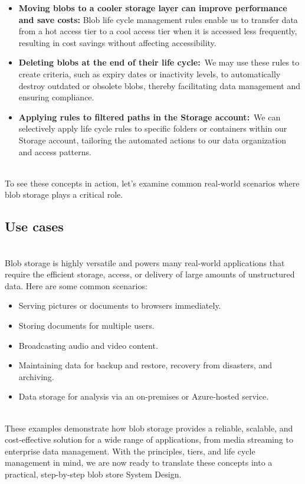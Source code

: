 \begin{itemize}
\item
\protect{}\label{XoHaQvOr_maHyq91j8WJo}
\textbf{Moving blobs to a cooler storage layer can improve performance and save costs:} Blob life cycle management rules enable us to transfer data from a hot access tier to a cool access tier when it is accessed less frequently, resulting in cost savings without affecting accessibility.
\item
\protect{}\label{j3zvw-vueDl8hr3NeI3CX}
\textbf{Deleting blobs at the end of their life cycle:}~We may use these rules to create criteria, such as expiry dates or inactivity levels, to automatically destroy outdated or obsolete blobs, thereby facilitating data management and ensuring compliance.
\item
\protect{}\label{OHqppa4jKzG86kPyIXQzt}
\textbf{Applying rules to filtered paths in the Storage account:}~We can selectively apply life cycle rules to specific folders or containers within our Storage account, tailoring the automated actions to our data organization and access patterns.
\end{itemize}
\\
To see these concepts in action, let's examine common real-world scenarios where blob storage plays a critical role.

\subsection{Use cases}\label{GWfuHH4lhkabt7-r0FlLg}
\\
Blob storage is highly versatile and powers many real-world applications that require the efficient storage, access, or delivery of large amounts of unstructured data. Here are some common scenarios:

\begin{itemize}
\item
\protect{}\label{PHfb-4lgqCWM1EN3BG9pP}
Serving pictures or documents to browsers immediately.
\item
\protect{}\label{IfOIo_Xw97UXs3pkcmySa}
Storing documents for multiple users.
\item
\protect{}\label{E2B_jbCJxgRabrW_rd2cn}
Broadcasting audio and video content.
\item
\protect{}\label{1qSzvVshMkEAHhQuCGa2r}
Maintaining data for backup and restore, recovery from disasters, and archiving.
\item
\protect{}\label{7gw3fF4cs9snWSbu9PQBB}
Data storage for analysis via an on-premises or Azure-hosted service.
\end{itemize}
\\
These examples demonstrate how blob storage provides a reliable, scalable, and cost-effective solution for a wide range of applications, from media streaming to enterprise data management. With the principles, tiers, and life cycle management in mind, we are now ready to translate these concepts into a practical, step-by-step blob store System Design.


